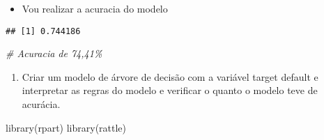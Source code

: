 \documentclass[
]{article}
\newenvironment{Shaded}{\begin{snugshade}}{\end{snugshade}}
\newcommand{\AttributeTok}[1]{\textcolor[rgb]{0.77,0.63,0.00}{#1}}
\newcommand{\CommentTok}[1]{\textcolor[rgb]{0.56,0.35,0.01}{\textit{#1}}}
\newcommand{\DecValTok}[1]{\textcolor[rgb]{0.00,0.00,0.81}{#1}}
\newcommand{\FloatTok}[1]{\textcolor[rgb]{0.00,0.00,0.81}{#1}}
\newcommand{\FunctionTok}[1]{\textcolor[rgb]{0.00,0.00,0.00}{#1}}
\newcommand{\NormalTok}[1]{#1}
\newcommand{\OtherTok}[1]{\textcolor[rgb]{0.56,0.35,0.01}{#1}}
\newcommand{\SpecialCharTok}[1]{\textcolor[rgb]{0.00,0.00,0.00}{#1}}
\newcommand{\StringTok}[1]{\textcolor[rgb]{0.31,0.60,0.02}{#1}}
\providecommand{\tightlist}{%
  \setlength{\itemsep}{0pt}\setlength{\parskip}{0pt}}
\begin{document}
\begin{itemize}
\tightlist
\item
  Vou realizar a acuracia do modelo
\end{itemize}

\begin{Shaded}
\end{Shaded}

\begin{verbatim}
## [1] 0.744186
\end{verbatim}

\begin{Shaded}
\begin{Highlighting}[]
\CommentTok{\# Acuracia de 74,41\%}
\end{Highlighting}
\end{Shaded}

\begin{enumerate}
\def\labelenumi{\alph{enumi})}
\setcounter{enumi}{1}
\tightlist
\item
  Criar um modelo de árvore de decisão com a variável target default e
  interpretar as regras do modelo e verificar o quanto o modelo teve de
  acurácia.
\end{enumerate}

\begin{Shaded}
\begin{Highlighting}[]
\FunctionTok{library}\NormalTok{(rpart)}
\FunctionTok{library}\NormalTok{(rattle)}
\end{Highlighting}
\end{Shaded}
\end{document}
